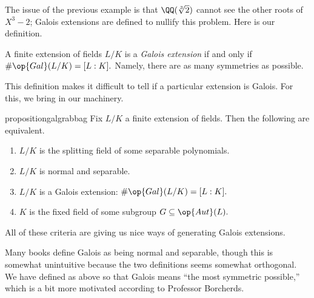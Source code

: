 \documentclass[../notes.tex]{subfiles}
\begin{document}
The issue of the previous example is that $\QQ(\sqrt[3]2)$ cannot see the other roots of $X^3-2$; Galois extensions are defined to nullify this problem. Here is our definition.
\begin{definition} \label{defi:galii}
	A finite extension of fields $L/K$ is a \textit{Galois extension} if and only if $\#\op{Gal}(L/K)=[L:K].$ Namely, there are as many symmetries as possible.
\end{definition}
This definition makes it difficult to tell if a particular extension is Galois. For this, we bring in our machinery.
\begin{restatable}{proposition}{galgrabbag}\label{prop:galgrabbag}
	Fix $L/K$ a finite extension of fields. Then the following are equivalent.
	\begin{enumerate}[label=(\alph*)]
		\item $L/K$ is the splitting field of some separable polynomials.
		\item $L/K$ is normal and separable.
		\item $L/K$ is a Galois extension: $\#\op{Gal}(L/K)=[L:K].$
		\item $K$ is the fixed field of some subgroup $G\subseteq\op{Aut}(L).$
	\end{enumerate}
\end{restatable}
All of these criteria are giving us nice ways of generating Galois extensions.
\begin{remark}
	Many books define Galois as being normal and separable, though this is somewhat unintuitive because the two definitions seems somewhat orthogonal. We have defined as above so that Galois means ``the most symmetric possible,'' which is a bit more motivated according to Professor Borcherds.
\end{remark}
\end{document}
